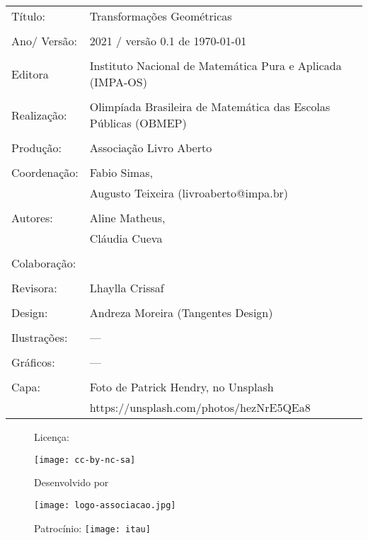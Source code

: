 
\begin{tabular}{p{}p{}}
Título: & Transformações Geométricas\\
\\
Ano/ Versão: & 2021 / versão 0.1 de \today\\
\\
Editora & Instituto Nacional de Matem\'atica Pura e Aplicada (IMPA-OS)\\
\\
Realização:& Olimp\'iada Brasileira de Matem\'atica das Escolas P\'ublicas (OBMEP)\\
\\
Produção:& Associação Livro Aberto\\
\\
Coordenação: & Fabio Simas, \\
			&  Augusto Teixeira (livroaberto@impa.br)\\
\\
  Autores: & Aline Matheus, \\
  		   & Cláudia Cueva\\

        
\\
Colaboração: & \\
\\
Revisora: & Lhaylla Crissaf \\

\\
Design: & Andreza Moreira (Tangentes Design) \\
\\
  Ilustrações: & --- \\ 
\\
Gráficos: & ---\\
\\
  Capa: & Foto de Patrick Hendry, no Unsplash \\
  		& https://unsplash.com/photos/hezNrE5QEa8 \\

\end{tabular}
\vspace{.5cm}



\begin{figure}[b]
\begin{minipage}[l]{5cm}
\centering

{\large Licença:}

  \texttt{[image: cc-by-nc-sa]}
\end{minipage}\hfill
\begin{minipage}[c]{5cm}
\centering
{\large Desenvolvido por}

\texttt{[image: logo-associacao.jpg]}
\end{minipage}
\begin{minipage}[r]{5cm}
\centering

{\large Patrocínio:}
  \vspace{1em}
  \texttt{[image: itau]}
\end{minipage}
\end{figure}

